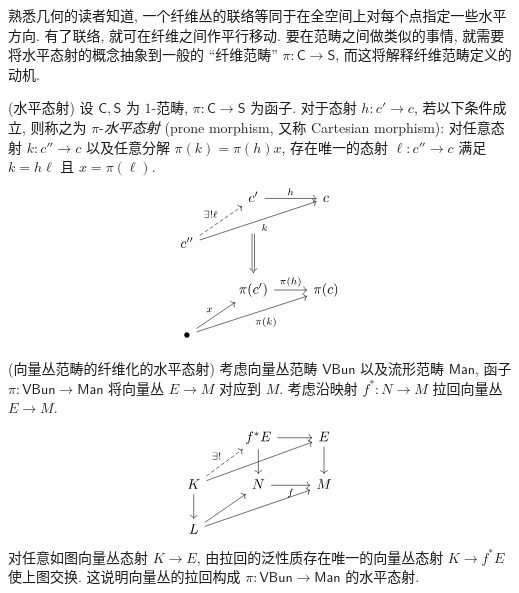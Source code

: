 熟悉几何的读者知道, 一个纤维丛的联络等同于在全空间上对每个点指定一些水平方向. 有了联络, 就可在纤维之间作平行移动. 要在范畴之间做类似的事情, 就需要将水平态射的概念抽象到一般的 ``纤维范畴'' $\pi\colon \mathsf C\to\mathsf S$, 而这将解释纤维范畴定义的动机.

\begin{definition}
	{(水平态射)}
	设 $\mathsf C,\mathsf S$ 为 $1$-范畴, $\pi\colon \mathsf C\to\mathsf S$ 为函子.
	对于态射 $h\colon c'\to c$, 若以下条件成立, 则称之为 $\pi$-\emph{水平态射} (prone morphism, 又称 Cartesian morphism):
	对任意态射 $k\colon c''\to c$ 以及任意分解 $\pi(k) = \pi(h)x$, 存在唯一的态射 $\ell\colon c''\to c$ 满足 $k=h\ell$ 且 $x=\pi(\ell)$.
	\[\begin{tikzcd}[ampersand replacement=\&]
		\& {c'} \& c \\
		{c''} \\
		\& {\pi(c')} \& {\pi(c)} \\
		\bullet
		\arrow["{\pi(h)}", from=3-2, to=3-3]
		\arrow["x", from=4-1, to=3-2]
		\arrow["{\exists ! \ell}", dashed, from=2-1, to=1-2]
		\arrow["h", from=1-2, to=1-3]
		\arrow["k"', from=2-1, to=1-3]
		\arrow[shorten <=19pt, shorten >=3pt, Rightarrow, from=1-2, to=3-2]
		\arrow["{\pi(k)}"', from=4-1, to=3-3]
	\end{tikzcd}\]
\end{definition}

\begin{example}
	{(向量丛范畴的纤维化的水平态射)}
	考虑向量丛范畴 $\mathsf {VBun}$ 以及流形范畴 $\mathsf {Man}$, 函子 $\pi\colon \mathsf {VBun} \to \mathsf {Man}$ 将向量丛 $E\to M$ 对应到 $M$.
	考虑沿映射 $f^*\colon N\to M$ 拉回向量丛 $E\to M$.
	\[\begin{tikzcd}[ampersand replacement=\&]
		\& {f^*E} \& E \\
		K \& N \& M \\
		L
		\arrow["f"', from=2-2, to=2-3]
		\arrow[from=1-2, to=2-2]
		\arrow[from=1-2, to=1-3]
		\arrow[from=1-3, to=2-3]
		\arrow[from=2-1, to=3-1]
		\arrow[from=3-1, to=2-3]
		\arrow[from=2-1, to=1-3]
		\arrow[from=3-1, to=2-2]
		\arrow["{\exists !}", dashed, from=2-1, to=1-2]
	\end{tikzcd}\]
	对任意如图向量丛态射 $K\to E$, 由拉回的泛性质存在唯一的向量丛态射 $K\to f^*E$ 使上图交换.
	这说明向量丛的拉回构成 $\pi\colon \mathsf {VBun} \to \mathsf {Man}$ 的水平态射.
\end{example}

